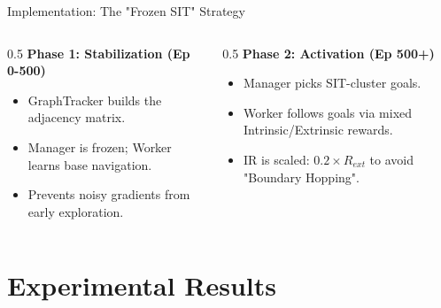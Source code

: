\documentclass[10pt,aspectratio=169]{beamer}
\begin{document}
\begin{frame}{Implementation: The "Frozen SIT" Strategy}
  \begin{columns}
    \begin{column}{0.5\textwidth}
      \textbf{Phase 1: Stabilization (Ep 0-500)}
      \begin{itemize}
        \item GraphTracker builds the adjacency matrix.
        \item Manager is frozen; Worker learns base navigation.
        \item Prevents noisy gradients from early exploration.
      \end{itemize}
    \end{column}
    \begin{column}{0.5\textwidth}
      \textbf{Phase 2: Activation (Ep 500+)}
      \begin{itemize}
        \item Manager picks SIT-cluster goals.
        \item Worker follows goals via mixed Intrinsic/Extrinsic rewards.
        \item IR is scaled: $0.2 \times R_{ext}$ to avoid "Boundary Hopping".
      \end{itemize}
    \end{column}
  \end{columns}
\end{frame}

\section{Experimental Results}
\end{document}
